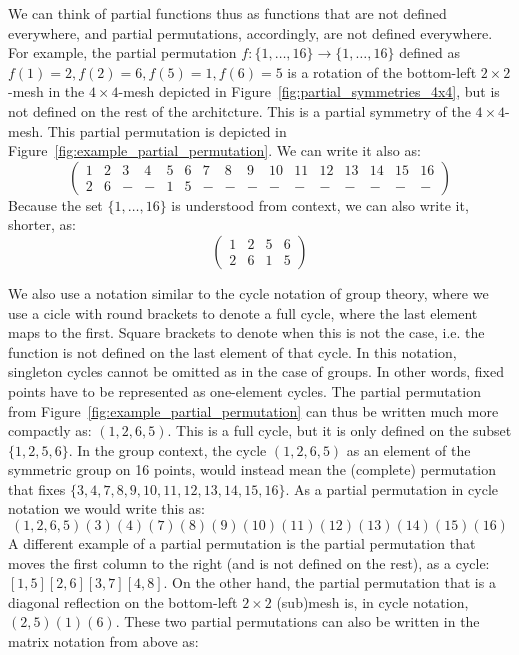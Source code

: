 We can think of partial functions thus as functions that are not defined everywhere, and partial permutations, accordingly, are not defined everywhere.
For example, the partial permutation $f : \{1,\ldots,16\} \rightarrow \{1,\ldots,16\}$ defined as $f(1) = 2, f(2) = 6, f(5) = 1, f(6) = 5$ is a rotation of the bottom-left $2 \times 2$-mesh in the $4\times 4$-mesh depicted in Figure~\ref{fig:partial_symmetries_4x4}, but is not defined on the rest of the architcture.
This is a partial symmetry of the $4\times 4$-mesh.
This partial permutation is depicted in Figure~\ref{fig:example_partial_permutation}.
We can write it also as:
\begin{equation*}
\left(
\begin{array}{llllllllllllllll}
 1 & 2 & 3 & 4 & 5 & 6 & 7 & 8 & 9 & 10 & 11 & 12 & 13 & 14 & 15 & 16 \\
 2 & 6 & - & - & 1 & 5 & - & - & - &  - &  - &  - &  - &  - &  - & -
\end{array}
\right)
\end{equation*}
Because the set $\{1,\ldots,16\}$ is understood from context, we can also write it, shorter, as:
\begin{equation*}
\left(
\begin{array}{llll}
1 & 2 & 5 & 6 \\
2 & 6 &  1 & 5
\end{array}
\right)
\end{equation*}

We also use a notation similar to the cycle notation of group theory, where we use a cicle with round brackets to denote a full cycle, where the last element maps to the first.
Square brackets to denote when this is not the case, i.e. the function is not defined on the last element of that cycle. In this notation, singleton cycles cannot be omitted as in the case of groups.
In other words, fixed points have to be represented as one-element cycles.
The partial permutation from Figure~\ref{fig:example_partial_permutation} can thus be written much more compactly as: $(1,2,6,5)$.
This is a full cycle, but it is only defined on the subset $\{1,2,5,6\}$.
In the group context, the cycle $(1,2,6,5)$ as an element of the symmetric group on 16 points, would instead mean the (complete) permutation that fixes $\{3,4,7,8,9,10,11,12,13,14,15,16\}$.
As a partial permutation in cycle notation we would write this as:
 \[(1,2,6,5)(3)(4)(7)(8)(9)(10)(11)(12)(13)(14)(15)(16) \]
A different example of a partial permutation is the partial permutation that moves the first column to the right (and is not defined on the rest), as a cycle: $[1,5][2,6][3,7][4,8]$.
On the other hand, the partial permutation that is a diagonal reflection on the bottom-left $2 \times 2$ (sub)mesh is, in cycle notation, $(2,5)(1)(6)$.
These two partial permutations can also be written in the matrix notation from above as:

